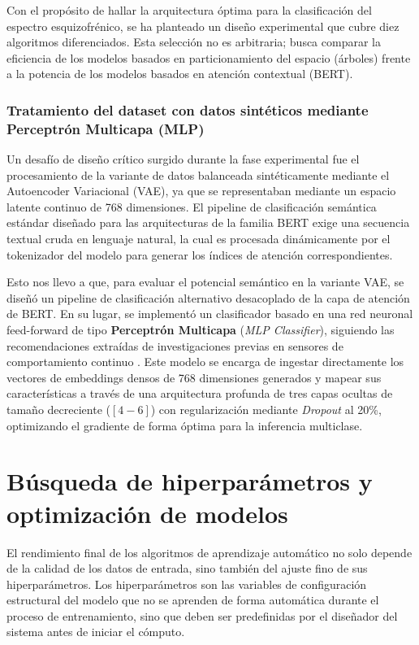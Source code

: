 \documentclass[12pt,a4paper,onecolumn,oneside]{report}
\begin{document}
Con el propósito de hallar la arquitectura óptima para la clasificación del espectro esquizofrénico, se ha planteado un diseño experimental que cubre diez algoritmos diferenciados. Esta selección no es arbitraria; busca comparar la eficiencia de los modelos basados en particionamiento del espacio (árboles) frente a la potencia de los modelos basados en atención contextual (BERT).

\subsubsection{Tratamiento del dataset con datos sintéticos mediante Perceptrón Multicapa (MLP)}
Un desafío de diseño crítico surgido durante la fase experimental fue el procesamiento de la variante de datos balanceada sintéticamente mediante el Autoencoder Variacional (VAE), ya que se representaban mediante un espacio latente continuo de 768 dimensiones. El pipeline de clasificación semántica estándar diseñado para las arquitecturas de la familia BERT exige una secuencia textual cruda en lenguaje natural, la cual es procesada dinámicamente por el tokenizador del modelo para generar los índices de atención correspondientes.

Esto nos llevo a que, para evaluar el potencial semántico en la variante VAE, se diseñó un pipeline de clasificación alternativo desacoplado de la capa de atención de BERT. En su lugar, se implementó un clasificador basado en una red neuronal feed-forward de tipo \textbf{Perceptrón Multicapa} (\textit{MLP Classifier}), siguiendo las recomendaciones extraídas de investigaciones previas en sensores de comportamiento continuo \cite{jimenez2023xai}. Este modelo se encarga de ingestar directamente los vectores de embeddings densos de 768 dimensiones generados y mapear sus características a través de una arquitectura profunda de tres capas ocultas de tamaño decreciente ($[4-6]$) con regularización mediante \textit{Dropout} al 20\%, optimizando el gradiente de forma óptima para la inferencia multiclase.

\section{Búsqueda de hiperparámetros y optimización de modelos}
\label{sec:busqueda_hiperparametros}

El rendimiento final de los algoritmos de aprendizaje automático no solo depende de la calidad de los datos de entrada, sino también del ajuste fino de sus hiperparámetros. Los hiperparámetros son las variables de configuración estructural del modelo que no se aprenden de forma automática durante el proceso de entrenamiento, sino que deben ser predefinidas por el diseñador del sistema antes de iniciar el cómputo.
\end{document}
